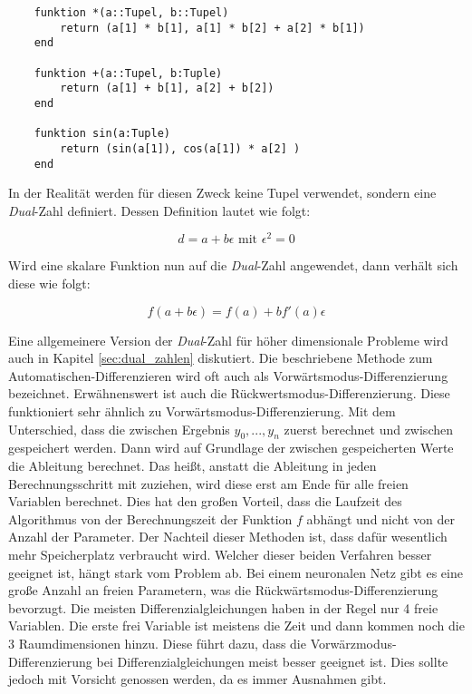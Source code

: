 \begin{lstlisting}
	funktion *(a::Tupel, b::Tupel)
    	return (a[1] * b[1], a[1] * b[2] + a[2] * b[1]) 
    end
    
    funktion +(a::Tupel, b:Tuple)
    	return (a[1] + b[1], a[2] + b[2])
    end
    
    funktion sin(a:Tuple)
    	return (sin(a[1]), cos(a[1]) * a[2] ) 
    end
\end{lstlisting}

In der Realität werden für diesen Zweck keine Tupel verwendet, sondern eine \textit{Dual}-Zahl definiert.
Dessen Definition lautet wie folgt:

\begin{equation}
	d = a + b \epsilon \text{ mit } \epsilon^2 = 0
\end{equation}

Wird eine skalare Funktion nun auf die \textit{Dual}-Zahl angewendet, dann verhält sich diese wie folgt:

\begin{equation}
	f( a + b \epsilon) = f(a) + b f'(a) \epsilon
\end{equation}

Eine allgemeinere Version der \textit{Dual}-Zahl für höher dimensionale Probleme wird auch in Kapitel \ref{sec:dual_zahlen} diskutiert.
Die beschriebene Methode zum Automatischen-Differenzieren wird oft auch als Vorwärtsmodus-Differenzierung bezeichnet.
Erwähnenswert ist auch die Rückwertsmodus-Differenzierung.
Diese funktioniert sehr ähnlich zu Vorwärtsmodus-Differenzierung.
Mit dem Unterschied, dass die zwischen Ergebnis $y_0, ... , y_n$ zuerst berechnet und zwischen gespeichert werden.
Dann wird auf Grundlage der zwischen gespeicherten Werte die Ableitung berechnet.
Das heißt, anstatt die Ableitung in jeden Berechnungsschritt mit zuziehen, wird diese erst am Ende für alle freien Variablen berechnet.
Dies hat den großen Vorteil, dass die Laufzeit des Algorithmus von der Berechnungszeit der Funktion $f$ abhängt und nicht von der Anzahl der Parameter.
Der Nachteil dieser Methoden ist, dass dafür wesentlich mehr Speicherplatz verbraucht wird.
Welcher dieser beiden Verfahren besser geeignet ist, hängt stark vom Problem ab.
Bei einem neuronalen Netz gibt es eine große Anzahl an freien Parametern, was die Rückwärtsmodus-Differenzierung bevorzugt.
Die meisten Differenzialgleichungen haben in der Regel nur 4 freie Variablen.
Die erste frei Variable ist meistens die Zeit und dann kommen noch die 3 Raumdimensionen hinzu.
Diese führt dazu, dass die Vorwärzmodus-Differenzierung bei Differenzialgleichungen meist besser geeignet ist.
Dies sollte jedoch mit Vorsicht genossen werden, da es immer Ausnahmen gibt.
